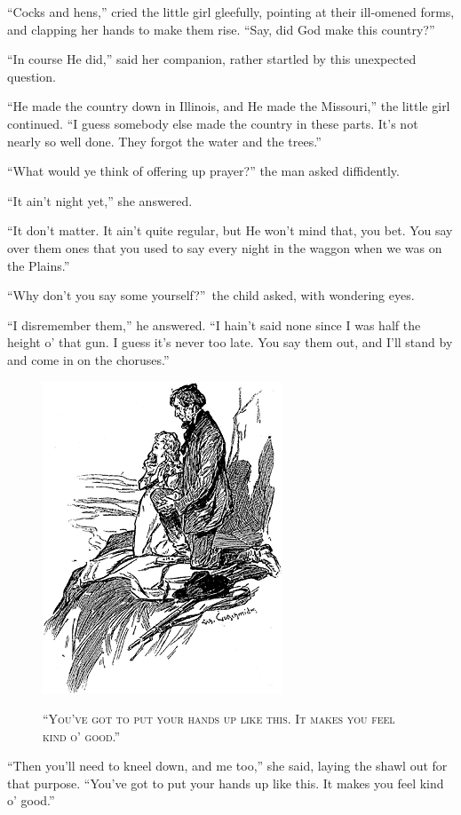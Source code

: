 \documentclass[12pt,english]{book}
\newcommand{\noun}[1]{\textsc{#1}}
\begin{document}
{}``Cocks and hens,'' cried the little girl gleefully, pointing
at their ill-omened forms, and clapping her hands to make them rise.
{}``Say, did God make this country?''

{}``In course He did,'' said her companion, rather startled by this
unexpected question.

{}``He made the country down in Illinois, and He made the Missouri,''
the little girl continued. {}``I guess somebody else made the country
in these parts. It's not nearly so well done. They forgot the water
and the trees.''

{}``What would ye think of offering up prayer?'' the man asked diffidently.

{}``It ain't night yet,'' she answered.

{}``It don't matter. It ain't quite regular, but He won't mind that,
you bet. You say over them ones that you used to say every night in
the waggon when we was on the Plains.''

{}``Why don't you say some yourself?''\ the child asked, with wondering
eyes.

{}``I disremember them,'' he answered. {}``I hain't said none since
I was half the height o' that gun. I guess it's never too late. You
say them out, and I'll stand by and come in on the choruses.''

%
\begin{figure}[htbp]
\noindent \begin{center}\includegraphics{images/study10-stud-14.png}\end{center}

\noindent \begin{center}\noun{{}``You've got to put your hands
up like this. It makes you feel kind o' good.''}\end{center}
\end{figure}
{}``Then you'll need to kneel down, and me too,'' she said, laying
the shawl out for that purpose. {}``You've got to put your hands
up like this. It makes you feel kind o' good.''
\end{document}
